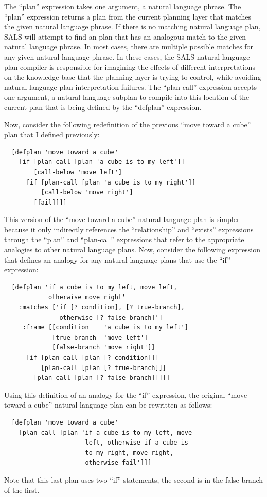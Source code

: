 The ``plan'' expression takes one argument, a natural language phrase.
The ``plan'' expression returns a plan from the current planning layer
that matches the given natural language phrase.  If there is no
matching natural language plan, SALS will attempt to find an plan that
has an analogous match to the given natural language phrase.  In most
cases, there are multiple possible matches for any given natural
language phrase.  In these cases, the SALS natural language plan
compiler is responsible for imagining the effects of different
interpretations on the knowledge base that the planning layer is
trying to control, while avoiding natural language plan interpretation
failures.  The ``plan-call'' expression accepts one argument, a
natural language subplan to compile into this location of the current
plan that is being defined by the ``defplan'' expression.

Now, consider the following redefinition of the previous ``move toward
a cube'' plan that I defined previously:
\begin{samepage}
\begin{Verbatim}
  [defplan 'move toward a cube'
    [if [plan-call [plan 'a cube is to my left']]
        [call-below 'move left']
      [if [plan-call [plan 'a cube is to my right']]
          [call-below 'move right']
        [fail]]]]
\end{Verbatim}
\end{samepage}
This version of the ``move toward a cube'' natural language plan is
simpler because it only indirectly references the ``relationship'' and
``exists'' expressions through the ``plan'' and ``plan-call''
expressions that refer to the appropriate analogies to other natural
language plans.  Now, consider the following expression that defines
an analogy for any natural language plans that use the ``if''
expression:
\begin{samepage}
\begin{Verbatim}
  [defplan 'if a cube is to my left, move left,
            otherwise move right'
    :matches ['if [? condition], [? true-branch],
               otherwise [? false-branch]']
     :frame [[condition    'a cube is to my left']
             [true-branch  'move left']
             [false-branch 'move right']]
      [if [plan-call [plan [? condition]]]
          [plan-call [plan [? true-branch]]]
        [plan-call [plan [? false-branch]]]]]
\end{Verbatim}
\end{samepage}
Using this definition of an analogy for the ``if'' expression, the
original ``move toward a cube'' natural language plan can be rewritten
as follows:
\begin{samepage}
\begin{Verbatim}
  [defplan 'move toward a cube'
    [plan-call [plan 'if a cube is to my left, move
                      left, otherwise if a cube is
                      to my right, move right,
                      otherwise fail']]]
\end{Verbatim}
\end{samepage}
Note that this last plan uses two ``if'' statements, the second is in
the false branch of the first.

